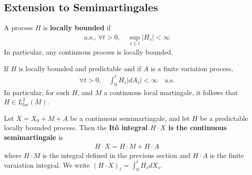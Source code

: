 \documentclass[12pt,a4paper]{article}
\begin{document}
\subsection{Extension to Semimartingales}

 A process $H$ is \textbf{locally bounded} if
\begin{align*}
\text{a.s., } \forall t>0, \quad \sup_{s\leq t} |H_s| < \infty
\end{align*}
In particular, any continuous process is locally bounded.
\s

\fact If $H$ is locally bounded and predictable and if $A$ is a finite variation process,
\begin{align*}
\forall t>0, \quad \int_0^t H_s |dA_s| < \infty \quad \text{a.s.}
\end{align*}
In particular, for such $H$, and $M$ a continuous local martingale, it follows that $H\in L_{loc}^2(M)$.
\s

 Let $X = X_0 + M + A$ be a continuous semimartingale, and let $H$ be a predictable locally bounded process. Then the \textbf{It\^o integral $H\cdot X$ is the continuous semimartingale} is
\begin{align*}
H \cdot X = H\cdot M + H\cdot A
\end{align*}
where $H\cdot M$ is the integral defined in the previous section and $H\cdot A$ is the finite varaiation integral. We write $(H\cdot X)_t = \int_0^t H_s dX_s$.
\s
\end{document}

